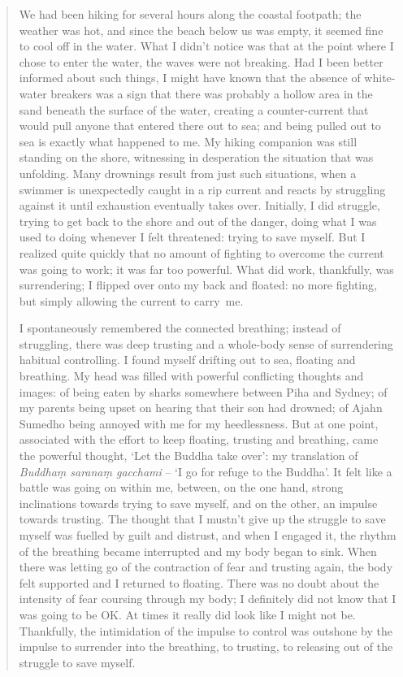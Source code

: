\begin{quotation}
We had been hiking for several hours along the coastal footpath; the
weather was hot, and since the beach below us was empty, it seemed fine
to cool off in the water. What I didn't notice was that at the point
where I chose to enter the water, the waves were not breaking. Had I
been better informed about such things, I might have known that the
absence of white-water breakers was a sign that there was probably a
hollow area in the sand beneath the surface of the water, creating a
counter-current that would pull anyone that entered there out to sea;
and being pulled out to sea is exactly what happened to me. My hiking
companion was still standing on the shore, witnessing in desperation the
situation that was unfolding. Many drownings result from just such
situations, when a swimmer is unexpectedly caught in a rip current and
reacts by struggling against it until exhaustion eventually takes over.
Initially, I did struggle, trying to get back to the shore and out of
the danger, doing what I was used to doing whenever I felt threatened:
trying to save myself. But I realized quite quickly that no amount of
fighting to overcome the current was going to work; it was far too
powerful. What did work, thankfully, was surrendering; I flipped over
onto my back and floated: no more fighting, but simply allowing the
current to carry~me.

I spontaneously remembered the connected breathing; instead of
struggling, there was deep trusting and a whole-body sense of
surrendering habitual controlling. I found myself drifting out to sea,
floating and breathing. My head was filled with powerful conflicting
thoughts and images: of being eaten by sharks somewhere between Piha and
Sydney; of my parents being upset on hearing that their son had drowned;
of Ajahn Sumedho being annoyed with me for my heedlessness. But at one
point, associated with the effort to keep floating, trusting and
breathing, came the powerful thought, `Let the Buddha take over': my
translation of \emph{Buddhaṃ saranaṃ gacchami} -- `I go for refuge to
the Buddha'. It felt like a battle was going on within me, between, on
the one hand, strong inclinations towards trying to save myself, and on
the other, an impulse towards trusting. The thought that I mustn't give
up the struggle to save myself was fuelled by guilt and distrust, and
when I engaged it, the rhythm of the breathing became interrupted and my
body began to sink. When there was letting go of the contraction of fear
and trusting again, the body felt supported and I returned to floating.
There was no doubt about the intensity of fear coursing through my body;
I definitely did not know that I was going to be OK. At times it really
did look like I might not be. Thankfully, the intimidation of the
impulse to control was outshone by the impulse to surrender into the
breathing, to trusting, to releasing out of the struggle to save myself.


\end{quotation}
